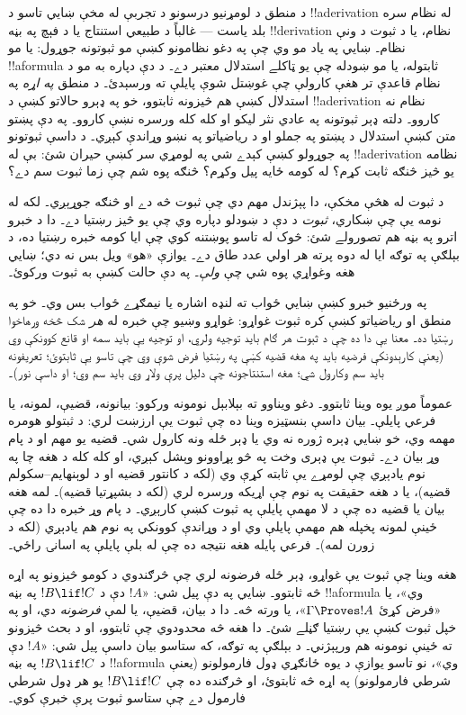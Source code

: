 \documentclass[../../../include/open-logic-section]{subfiles}
\begin{document}


د منطق د لومړنيو درسونو د تجربې له مخې ښايي تاسو د
!!a{derivation} له نظام سره بلد ياست --- غالباً د طبيعي
استنتاج يا د فېچ په بڼه !!{derivation} نظام، يا د ثبوت
د ونې نظام۔ ښايي په ياد مو وي چې په دغو نظامونو کښې
مو ثبوتونه جوړول: يا مو !!a{formula} ثابتوله، يا مو
ښودله چې يو ټاکلے استدلال معتبر دے۔ د دې دپاره به مو
د نظام قاعدې تر هغې کارولې چې غوښتل شوې پايلې ته
ورسېدئ۔ د منطق \emph{په اړه} په استدلال کښې هم څيزونه
ثابتوو، خو په ډېرو حالاتو کښې د !!a{derivation} نظام
نه کاروو۔ دلته ډېر ثبوتونه په عادي نثر ليکو او کله
کله ورسره نښې کاروو۔ په دې پښتو متن کښې استدلال د
پښتو په جملو او د رياضياتو په نښو وړاندې کېږي۔
د داسې ثبوتونو په جوړولو کښې کېدے شي په لومړي سر
کښې حيران شئ: بې له !!a{derivation} نظامه يو څيز
څنګه ثابت کړم؟ له کومه ځايه پيل وکړم؟ څنګه پوه شم
چې زما ثبوت سم دے؟

د ثبوت له هڅې مخکې، دا پېژندل مهم دي چې ثبوت څه
دے او څنګه جوړېږي۔ لکه له نومه يې چې ښکاري،
\emph{ثبوت} د دې د ښودلو دپاره وي چې يو څيز رښتيا
دے۔ دا د خبرو اترو په بڼه هم تصورولے شئ: څوک
له تاسو پوښتنه کوي چې ايا کومه خبره رښتيا ده، د
بېلګې په توګه ايا له دوه پرته هر اولي عدد طاق دے۔
يوازې «هو» ويل بس نه دي؛ ښايي هغه وغواړي پوه شي
چې \emph{ولې}۔ په دې حالت کښې به ثبوت ورکوئ۔

په ورځنيو خبرو کښې ښايي ځواب ته لنډه اشاره يا
نيمګړے ځواب بس وي۔ خو په منطق او رياضياتو کښې
کره ثبوت غواړو: غواړو وښيو چې خبره له \emph{هر}
شک څخه ورهاخوا رښتيا ده۔ معنا يې دا ده چې د
ثبوت هر ګام بايد توجيه ولري، او توجيه يې بايد
سمه او قانع کوونکې وي (يعنې کارېدونکې فرضيه
بايد په هغه قضيه کښې په رښتيا فرض شوې وي چې
تاسو يې ثابتوئ؛ تعريفونه بايد سم وکارول شي؛
هغه استنتاجونه چې دليل پرې ولاړ وي بايد سم وي؛
او داسې نور)۔

عموماً موږ يوه وينا ثابتوو۔ دغو ويناوو ته بېلابېل
نومونه ورکوو: بيانونه، قضيې، لمونه، يا فرعي پايلې۔
بيان داسې بنسټيزه وينا ده چې ثبوت يې ارزښت لري:
د ثبتولو هومره مهمه وي، خو ښايي ډېره ژوره نه وي
يا ډېر ځله ونه کارول شي۔ قضيه يو مهم او د پام وړ
بيان دے۔ ثبوت يې ډېری وخت په څو پړاوونو وېشل کېږي،
او کله کله د هغه چا په نوم يادېږي چې لومړے يې
ثابته کړې وي (لکه د کانتور قضيه او د
لوېنهايم--سکولم قضيه)، يا د هغه حقيقت په نوم چې
اړيکه ورسره لري (لکه د بشپړتيا قضيه)۔ لمه هغه
بيان يا قضيه ده چې د لا مهمې پايلې په ثبوت کښې
کارېږي۔ د پام وړ خبره دا ده چې ځينې لمونه
پخپله هم مهمې پايلې وي او د وړاندې کوونکي په نوم
هم يادېږي (لکه د زورن لمه)۔ فرعي پايله هغه نتيجه
ده چې له بلې پايلې په اسانۍ راځي۔

هغه وينا چې ثبوت يې غواړو، ډېر ځله فرضونه لري
چې څرګندوي د کومو څيزونو په اړه څه ثابتوو۔ ښايي
په دې پيل شي: «$!A$ دې د $!B \lif !C$ په بڼه
!!a{formula} وي»، يا «فرض کړئ $\Gamma \Proves !A$»،
يا ورته څه۔ دا د بيان، قضيې، يا لمې \emph{فرضونه}
دي، او په خپل ثبوت کښې يې رښتيا ګڼلے شئ۔ دا
هغه څه محدودوي چې ثابتوو، او د بحث څيزونو ته
ځينې نومونه هم ورپېژني۔ د بېلګې په توګه، که ستاسو
بيان داسې پيل شي: «$!A$ دې د $!B \lif !C$ په بڼه
!!a{formula} وي»، نو تاسو يوازې د يوه ځانګړي ډول
فارمولونو (يعنې شرطي فارمولونو) په اړه څه ثابتوئ،
او څرګنده ده چې $!B \lif !C$ يو هر ډول شرطي
فارمول دے چې ستاسو ثبوت پرې خبرې کوي۔
\end{document}
